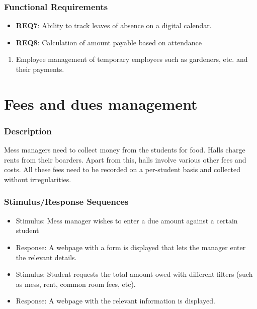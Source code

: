 \documentclass{scrreprt}
\begin{document}
\subsubsection{Functional Requirements}
\begin{itemize}
    \item \textbf{REQ7}: Ability to track leaves of absence on a digital calendar.
    \item \textbf{REQ8}: Calculation of amount payable based on attendance
\end{itemize}


\begin{enumerate}
    \item Employee management of temporary employees such as gardeners, etc. and their payments.
\end{enumerate}



\section{Fees and dues management}
\subsubsection{Description}
Mess managers need to collect money from the students for food. Halls charge rents from their boarders. Apart from this, halls involve various other fees and costs. All these fees need to be recorded on a per-student basis and collected without irregularities.
\subsubsection{Stimulus/Response Sequences}
\begin{itemize}
    \item Stimulus: Mess manager wishes to enter a due amount against a certain student
    \item Response: A webpage with a form is displayed that lets the manager enter the relevant details.
\end{itemize}

\begin{itemize}
    \item Stimulus: Student requests the total amount owed with different filters (such as mess, rent, common room fees, etc).
    \item Response: A webpage with the relevant information is displayed.
\end{itemize}
\end{document}
